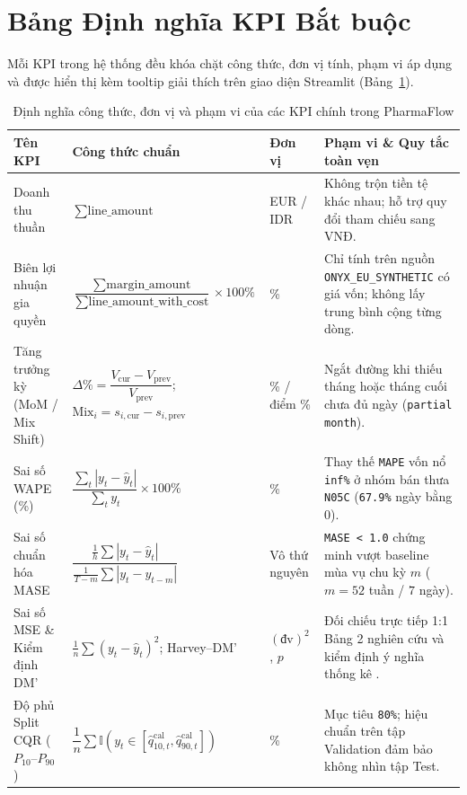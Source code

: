 \section{Bảng Định nghĩa KPI Bắt buộc}
Mỗi KPI trong hệ thống đều khóa chặt công thức, đơn vị tính, phạm vi áp dụng và được hiển thị kèm tooltip giải thích trên giao diện Streamlit (Bảng~\ref{tab:kpi_defs}).

\begin{table}[H]
\centering
\caption{Định nghĩa công thức, đơn vị và phạm vi của các KPI chính trong PharmaFlow}
\label{tab:kpi_defs}
\renewcommand{\arraystretch}{1.22}
\begin{tabularx}{\textwidth}{|p{}|p{}|p{}|X|}
\hline
\textbf{Tên KPI} & \textbf{Công thức chuẩn} & \textbf{Đơn vị} & \textbf{Phạm vi \& Quy tắc toàn vẹn} \\
\hline
Doanh thu thuần & $\sum \text{line\_amount}$ & EUR / IDR & Không trộn tiền tệ khác nhau; hỗ trợ quy đổi tham chiếu sang VNĐ. \\
\hline
Biên lợi nhuận gia quyền & $\dfrac{\sum \text{margin\_amount}}{\sum \text{line\_amount\_with\_cost}} \times 100\%$ & \% & Chỉ tính trên nguồn \texttt{ONYX\_EU\_SYNTHETIC} có giá vốn; không lấy trung bình cộng từng dòng. \\
\hline
Tăng trưởng kỳ (MoM / Mix Shift) & $\Delta\% = \dfrac{V_{\text{cur}} - V_{\text{prev}}}{V_{\text{prev}}}$; $\text{Mix}_i = s_{i,\text{cur}} - s_{i,\text{prev}}$ & \% / điểm \% & Ngắt đường khi thiếu tháng hoặc tháng cuối chưa đủ ngày (\texttt{partial month}). \\
\hline
Sai số WAPE (\%) & $\dfrac{\sum_{t} |y_t - \hat{y}_t|}{\sum_{t} y_t} \times 100\%$ & \% & Thay thế \texttt{MAPE} vốn nổ \texttt{inf\%} ở nhóm bán thưa \texttt{N05C} (\texttt{67.9\%} ngày bằng 0). \\
\hline
Sai số chuẩn hóa MASE & $\dfrac{\frac{1}{h}\sum |y_t - \hat{y}_t|}{\frac{1}{T-m}\sum |y_t - y_{t-m}|}$ & Vô thứ nguyên & \texttt{MASE < 1.0} chứng minh vượt baseline mùa vụ chu kỳ $m$ ($m=52$ tuần / $7$ ngày). \\
\hline
Sai số MSE \& Kiểm định DM' & $\frac{1}{n}\sum (y_t - \hat{y}_t)^2$; Harvey--DM' & $(\text{đv})^2$, $p$ & Đối chiếu trực tiếp 1:1 Bảng 2 nghiên cứu \cite{fourkiotis2024} và kiểm định ý nghĩa thống kê \cite{harvey1997dm}. \\
\hline
Độ phủ Split CQR ($P_{10}$--$P_{90}$) & $\dfrac{1}{n}\sum \mathbb{I}(y_t \in [\hat{q}_{10,t}^{\text{cal}}, \hat{q}_{90,t}^{\text{cal}}])$ & \% & Mục tiêu \texttt{80\%}; hiệu chuẩn trên tập Validation \cite{romano2019cqr} đảm bảo không nhìn tập Test. \\
\hline
\end{tabularx}
\end{table}

